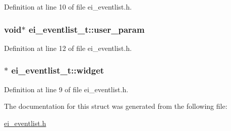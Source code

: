 Definition at line 10 of file ei\+\_\+eventlist.\+h.

\hypertarget{structei__eventlist__t_aa0a5cff6ec4391c1a2c24bfd02323479}{
\subsubsection[{user\+\_\+param}]{\setlength{\rightskip}{0pt plus 5cm}void$\ast$ ei\+\_\+eventlist\+\_\+t\+::user\+\_\+param}}\label{structei__eventlist__t_aa0a5cff6ec4391c1a2c24bfd02323479}


Definition at line 12 of file ei\+\_\+eventlist.\+h.

\hypertarget{structei__eventlist__t_a9842e40b69204e5456167184ca03770d}{
\subsubsection[{widget}]{$\ast$ ei\+\_\+eventlist\+\_\+t\+::widget}}\label{structei__eventlist__t_a9842e40b69204e5456167184ca03770d}


Definition at line 9 of file ei\+\_\+eventlist.\+h.



The documentation for this struct was generated from the following file\+:\begin{DoxyCompactItemize}
\item 
\hyperlink{ei__eventlist_8h}{ei\+\_\+eventlist.\+h}\end{DoxyCompactItemize}
